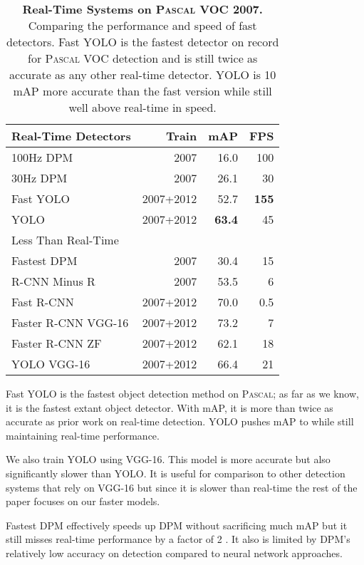 \documentclass[10pt,twocolumn,letterpaper]{article}
\begin{document}
\begin{table}[h]
\begin{center}
\begin{tabular}{lrrr}
Real-Time Detectors & Train & mAP & FPS\\
\hline
100Hz DPM \cite{sadeghi201430hz}& 2007 & 16.0 & 100\\
30Hz DPM \cite{sadeghi201430hz} & 2007 & 26.1 & 30 \\
Fast YOLO & 2007+2012 & 52.7 & \textbf{155} \\
YOLO & 2007+2012 & \textbf{63.4} & 45 \\
\hline
\hline
Less Than Real-Time &  & \\
\hline
Fastest DPM \cite{yan2014fastest} & 2007 & 30.4 & 15 \\
R-CNN Minus R \cite{lenc2015r} & 2007 & 53.5 & 6 \\
Fast R-CNN \cite{DBLP:journals/corr/Girshick15}& 2007+2012 & 70.0 & 0.5 \\
Faster R-CNN VGG-16\cite{ren2015faster}& 2007+2012 & 73.2 & 7 \\
Faster R-CNN ZF \cite{ren2015faster}& 2007+2012 & 62.1 & 18 \\
YOLO VGG-16 & 2007+2012 & 66.4 & 21 \\
\end{tabular}
\end{center}
\caption{\small \textbf{Real-Time Systems on \textsc{Pascal} VOC 2007.} Comparing the performance and speed of fast detectors. Fast YOLO is the fastest detector on record for \textsc{Pascal} VOC detection and is still twice as accurate as any other real-time detector. YOLO is 10 mAP more accurate than the fast version while still well above real-time in speed.}
\label{timing}
\end{table}

Fast YOLO is the fastest object detection method on \textsc{Pascal}; as far as we know, it is the fastest extant object detector. With  mAP, it is more than twice as accurate as prior work on real-time detection. YOLO pushes mAP to  while still maintaining real-time performance.

We also train YOLO using VGG-16. This model is more accurate but also significantly slower than YOLO. It is useful for comparison to other detection systems that rely on VGG-16 but since it is slower than real-time the rest of the paper focuses on our faster models.

Fastest DPM effectively speeds up DPM without sacrificing much mAP but it still misses real-time performance by a factor of 2 \cite{yan2014fastest}. It also is limited by DPM's relatively low accuracy on detection compared to neural network approaches.
\end{document}
